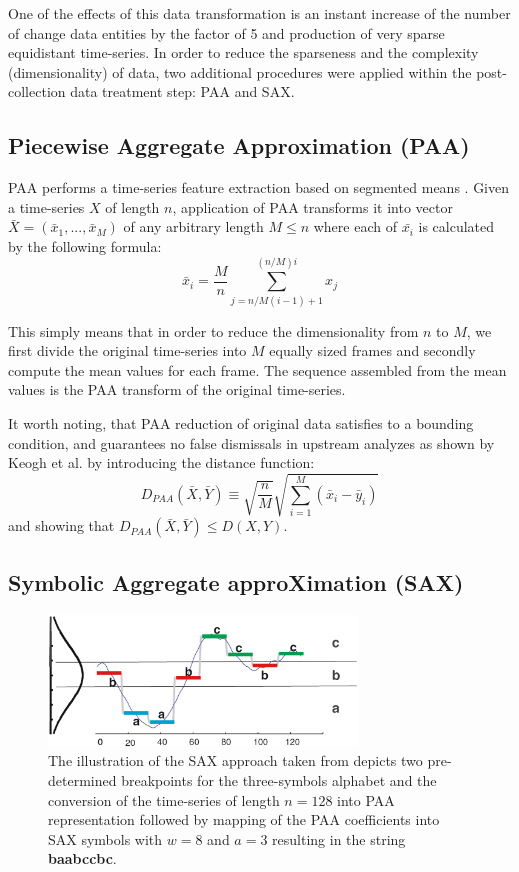 \documentclass[conference]{worldcomp}
\begin{document}
One of the effects of this data transformation is an instant increase of the number of
change data entities by the factor of 5 and production of very sparse equidistant time-series.
In order to reduce the sparseness and the complexity (dimensionality) of data, 
two additional procedures were applied within the post-collection data treatment step: PAA and SAX.

\subsection{Piecewise Aggregate Approximation (PAA)} \label{paa}
PAA performs a time-series feature extraction based on segmented means \cite{citeulike:2946589}. 
Given a time-series $X$ 
of length $n$, application of PAA transforms it into vector $\bar{X} = ( \bar{x}_{1}, ..., \bar{x}_{M} )$ of 
any arbitrary length $M \leq n$ where each of $\bar{x_{i}}$ is calculated by the following formula:
\begin{equation}
\bar{x}_{i} = \frac{M}{n} \sum_{j=n/M(i-1)+1}^{(n/M)i} x_{j}
\label{eq:paa}
\end{equation}

This simply means that in order to reduce the dimensionality from $n$ to $M$, 
we first divide the original time-series into $M$ equally sized frames and secondly compute the mean 
values for each frame. The sequence assembled from the mean values is the PAA transform of 
the original time-series. 

It worth noting, that PAA reduction of original data satisfies to a bounding condition, and 
guarantees no false dismissals in upstream analyzes as shown by Keogh et al. \cite{citeulike:3000416}
by introducing the distance function:
\begin{equation}
D_{PAA}(\bar{X}, \bar{Y}) \equiv \sqrt{\frac{n}{M}} \sqrt{ \sum_{i=1}^{M} 
\left(  \bar{x}_{i} - \bar{y}_{i} \right)}
\label{eq:paa_distance}
\end{equation}
and showing that $D_{PAA}(\bar{X}, \bar{Y}) \leq D(X,Y)$.

\subsection{Symbolic Aggregate approXimation (SAX)} \label{sax}
\begin{figure}[b]
   \centering
   \includegraphics[height=35mm]{figures/sax_intro.eps}
   \caption{The illustration of the SAX approach taken from \cite{citeulike:2821475} depicts 
    two pre-determined breakpoints for the three-symbols alphabet and the conversion of the time-series of 
    length $n=128$ into PAA representation followed by mapping of the PAA coefficients into SAX symbols with 
    $w=8$ and $a=3$ resulting in the string \textbf{baabccbc}.}
   \label{fig:sax_intro}
\end{figure}
\end{document}
